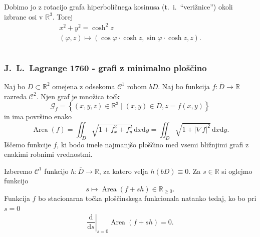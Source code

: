 \documentclass[8pt]{beamer}
\theoremstyle{definition}
\theoremstyle{remark}
\theoremstyle{plain}
\numberwithin{equation}{section}  %
\begin{document}
\begin{frame}
\begin{columns}
\begin{column}{0.5\textwidth}
            Dobimo jo z rotacijo grafa hiperboličnega kosinusa (t.~i.~“verižnice”) okoli izbrane osi v $\mathbb{R}^3$. Torej
            \begin{gather*}
                x^2+y^2=\cosh^2{z} \\
                (\varphi, z) \mapsto(\cos \varphi \cdot \cosh z, \sin \varphi \cdot \cosh z, z).
            \end{gather*}

        \end{column}
    \end{columns}

\end{frame}

\begin{frame}
    \frametitle{J.~L.~Lagrange 1760 - grafi z minimalno ploščino}

    Naj bo $D \subset \mathbb{R}^2$ omejena z odsekoma $\mathscr{C}^1$ robom $b D$. Naj bo funkcija $f: \overline{D} \rightarrow \mathbb{R}$ razreda $\mathscr{C}^2$. Njen graf je množica točk
    \begin{equation*}
        \mathcal{G}_f=\left\{(x, y, z) \in \mathbb{R}^3 \mid(x, y) \in \overline{D}, z=f(x, y)\right\}    
    \end{equation*}
    in ima površino enako
    \begin{equation*}
        \operatorname{Area}(f)=\iint_{D} \sqrt{1+f_x^2+f_y^2} \, \mathrm{d} x \mathrm{d} y=\iint_{D} \sqrt{1+|\nabla f|^2} \, \mathrm{d} x \mathrm{d} y.    
    \end{equation*}
    \pause
    Iščemo funkcije $f$, ki bodo imele najmanjšo ploščino med vsemi bližnjimi grafi z enakimi robnimi vrednostmi.
    \pause
    \vspace{0.8em}

    Izberemo $\mathscr{C}^1$ funkcijo $h: \overline{D} \rightarrow \mathbb{R}$, za katero velja $h(b D) \equiv 0$. Za $s \in \mathbb{R}$ si oglejmo funkcijo
    \begin{equation*}
        s \longmapsto \operatorname{Area}(f+s h) \in \mathbb{R}_{\geq 0} .    
    \end{equation*}
    Funkcija $f$ bo stacionarna točka \textcolor{red1}{ploščinskega funkcionala} natanko tedaj, ko bo pri $s=0$
    \begin{equation*}
        \left.\frac{\mathrm{d}}{\mathrm{d} s}\right|_{s=0} \operatorname{Area}(f+s h)=0.
    \end{equation*}
    
\end{frame}
\end{document}
